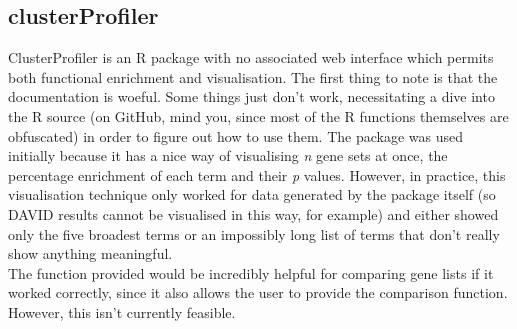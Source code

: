 \documentclass[11pt, oneside]{article}
\begin{document}
\subsection*{clusterProfiler}
ClusterProfiler is an R package with no associated web interface which permits both functional enrichment and visualisation. The first thing to note is that the documentation is woeful. Some things just don't work, necessitating a dive into the R source (on GitHub, mind you, since most of the R functions themselves are obfuscated) in order to figure out how to use them. The package was used initially because it has a nice way of visualising \emph{n} gene sets at once, the percentage enrichment of each term and their \emph{p} values. However, in practice, this visualisation technique only worked for data generated by the package itself (so DAVID results cannot be visualised in this way, for example) and either showed only the five broadest terms or an impossibly long list of terms that don't really show anything meaningful.\\
The function provided would be incredibly helpful for comparing gene lists if it worked correctly, since it also allows the user to provide the comparison function. However, this isn't currently feasible.
\end{document}
